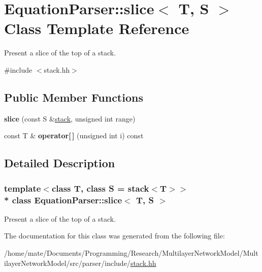 \hypertarget{classEquationParser_1_1slice}{}\section{Equation\+Parser\+:\+:slice$<$ T, S $>$ Class Template Reference}
\label{classEquationParser_1_1slice}


Present a slice of the top of a stack.  




{\ttfamily \#include $<$stack.\+hh$>$}

\subsection*{Public Member Functions}
\begin{DoxyCompactItemize}
\item 
{\bfseries slice} (const S \&\hyperlink{classEquationParser_1_1stack}{stack}, unsigned int range)\hypertarget{classEquationParser_1_1slice_aa6e11d2a5286d4c024712d20c695d84e}{}\label{classEquationParser_1_1slice_aa6e11d2a5286d4c024712d20c695d84e}

\item 
const T \& {\bfseries operator\mbox{[}$\,$\mbox{]}} (unsigned int i) const \hypertarget{classEquationParser_1_1slice_a19f1344bb2a3e5a354233063389d09b2}{}\label{classEquationParser_1_1slice_a19f1344bb2a3e5a354233063389d09b2}

\end{DoxyCompactItemize}


\subsection{Detailed Description}
\subsubsection*{template$<$class T, class S = stack$<$\+T$>$$>$\\*
class Equation\+Parser\+::slice$<$ T, S $>$}

Present a slice of the top of a stack. 

The documentation for this class was generated from the following file\+:\begin{DoxyCompactItemize}
\item 
/home/mate/\+Documents/\+Programming/\+Research/\+Multilayer\+Network\+Model/\+Multilayer\+Network\+Model/src/parser/include/\hyperlink{stack_8hh}{stack.\+hh}\end{DoxyCompactItemize}

